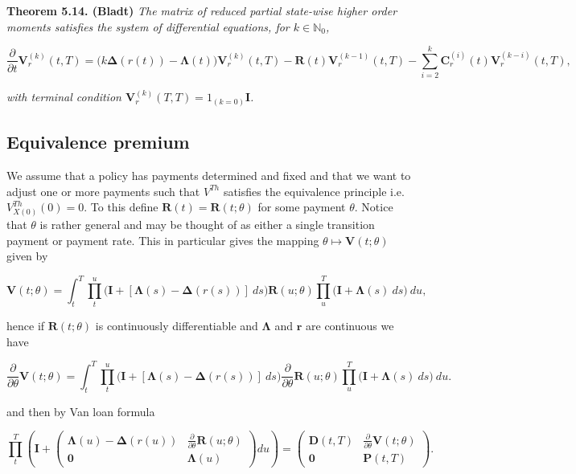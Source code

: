 \documentclass[a4paper,12pt,openany]{book}
\begin{document}
\textbf{Theorem 5.14. (Bladt)} \emph{The matrix of reduced partial state-wise higher order moments satisfies the system of differential equations, for \(k\in \mathbb N_0\),}

\[
\frac{\partial}{\partial t}\mathbf V_r^{(k)}(t,T)=\Big(k\mathbf\Delta(r(t)) - \mathbf \Lambda(t)\Big)\mathbf V_r^{(k)}(t,T)-\mathbf R(t)\mathbf V_r^{(k-1)}(t,T)-\sum_{i=2}^k\mathbf C_r^{(i)}(t)\mathbf V_r^{(k-i)}(t,T),
\]

\emph{with terminal condition \(\mathbf V_r^{(k)}(T,T)=1_{(k=0)}\mathbf I\).}

\hypertarget{equivalence-premium}{%
\subsection{Equivalence premium}\label{equivalence-premium}}

We assume that a policy has payments determined and fixed and that we want to adjust one or more payments such that \(V^{Th}\) satisfies the equivalence principle i.e.~\(V_{X(0)}^{Th}(0)=0\). To this define \(\mathbf R(t)=\mathbf R(t;\theta)\) for some payment \(\theta\). Notice that \(\theta\) is rather general and may be thought of as either a single transition payment or payment rate. This in particular gives the mapping \(\theta \mapsto \mathbf V(t;\theta)\) given by

\[
\mathbf V(t;\theta) = \int_t^T\prod_t^u\Big(\mathbf I +[\mathbf\Lambda(s)-\mathbf\Delta(r(s))]\ ds\Big)\mathbf R(u;\theta)\prod_u^T\Big(\mathbf I +\mathbf \Lambda(s)\ ds\Big)\ du,
\]

hence if \(\mathbf R(t;\theta)\) is continuously differentiable and \(\mathbf \Lambda\) and \(\mathbf r\) are continuous we have

\[
\frac{\partial}{\partial \theta}\mathbf V(t;\theta) = \int_t^T\prod_t^u\Big(\mathbf I +[\mathbf\Lambda(s)-\mathbf\Delta(r(s))]\ ds\Big)\frac{\partial}{\partial \theta}\mathbf R(u;\theta)\prod_u^T\Big(\mathbf I +\mathbf \Lambda(s)\ ds\Big)\ du.
\]

and then by Van loan formula

\[
\prod_t^T\left(\mathbf I+
\begin{pmatrix}
\mathbf \Lambda(u)-\mathbf \Delta(r(u)) & \frac{\partial}{\partial \theta}\mathbf R(u;\theta)\\
\mathbf 0 & \mathbf \Lambda(u)
\end{pmatrix}du
\right)=
\begin{pmatrix}
\mathbf D(t,T) & \frac{\partial}{\partial \theta}\mathbf V(t;\theta)\\
\mathbf 0 & \mathbf P(t,T)
\end{pmatrix}.
\]
\end{document}
